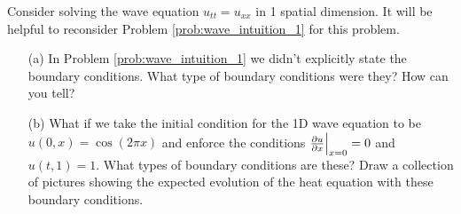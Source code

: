 \begin{problem}
    Consider solving the wave equation $u_{tt} = u_{xx}$ in 1 spatial dimension.  It will
    be helpful to reconsider Problem \ref{prob:wave_intuition_1} for this problem.
    \begin{enumerate}
        \item[(a)] In Problem \ref{prob:wave_intuition_1} we didn't explicitly state the
            boundary conditions.  What type of boundary conditions were they?  How can
            you tell?
        \item[(b)] What if we take the initial condition for the 1D wave equation to be
            $u(0,x) = \cos(2\pi x)$ and enforce the conditions $\frac{\partial{u}}{\partial{x}}\Big|_{x=0} = 0$
            and $u(t,1) = 1$.
            What types of boundary conditions are these?  Draw a collection of pictures
            showing the expected evolution of the heat equation with these boundary
            conditions.
    \end{enumerate}
\end{problem}


